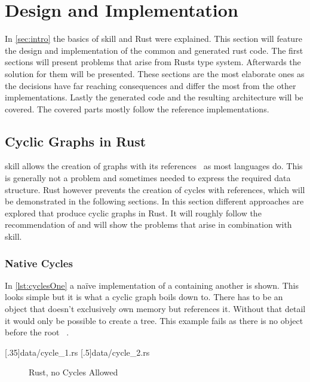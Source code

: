 \documentclass[thesis]{subfiles}
\begin{document}
\chapter{Design and Implementation}%
\vspace*{-1em}
In \autoref{sec:intro} the basics of \gls{skill} and Rust were explained.
This section will feature the design and implementation of the common and generated rust code.
The first sections will present problems that arise from Rusts type system.
Afterwards the solution for them will be presented.
These sections are the most elaborate ones as the decisions have far reaching consequences and differ the most from the other implementations.
Lastly the generated code and the resulting architecture will be covered.
The covered parts mostly follow the reference implementations.

\section{Cyclic Graphs in Rust}\label{sec:graph}
  \gls{skill} allows the creation of graphs with its references~\autocite[9]{skill-dis} as most languages do.
  This is generally not a problem and sometimes needed to express the required data structure.
  Rust however prevents the creation of cycles with references, which will be demonstrated in the following sections.
  In this section different approaches are explored that produce cyclic graphs in Rust.
  It will roughly follow the recommendation of \autocite{rust-faq} and will show the problems that arise in combination with \gls{skill}.

  \subsection{Native Cycles}
    In \autoref{lst:cyclesOne} a na\"ive implementation of a \Node containing another \Node is shown.
    This looks simple but it is what a cyclic graph boils down to.
    There has to be an object that doesn't exclusively own memory but references it.
    Without that detail it would only be possible to create a tree.
    This example fails as there is no \Node object before the root \Node~.

    \LstTikzBox{\cyclesOne}[.35\linewidth]{data/cycle_1.rs}
    \LstTikzBox{\cyclesTwo}[.5\linewidth]{data/cycle_2.rs}

    \begin{figure}[ht]
      \captionsetup{type=lstlisting}
       \hfill%
      \caption{Rust, no Cycles Allowed}\label{lst:cycles}
    \end{figure}
\end{document}

